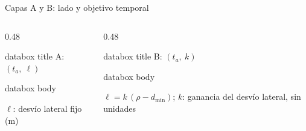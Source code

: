 \documentclass[aspectratio=43,11pt]{beamer}
\newenvironment{databox}[1]{%
  \begin{beamercolorbox}[wd=\linewidth,sep=1mm,center]{databox title}%
    #1
  \end{beamercolorbox}%
  \par\nointerlineskip
  \begin{beamercolorbox}[wd=\linewidth,sep=2mm]{databox body}%
}{%
  \end{beamercolorbox}%
}
\begin{document}
\begin{frame}{Capas A y B: lado y objetivo temporal}
  \vspace{2mm}
  \begin{columns}[T,onlytextwidth]
    \begin{column}{0.48\textwidth}
      \begin{databox}{A: $(t_a,\ \ell)$}
        $\ell$: desvío lateral fijo (m)
      \end{databox}
    \end{column}
    \begin{column}{0.48\textwidth}
      \begin{databox}{B: $(t_a,\ k)$}
        $\ell = k\,(\rho - d_{\min})$; $k$: ganancia del desvío lateral, sin unidades
      \end{databox}
    \end{column}
  \end{columns}
\end{frame}
\end{document}
